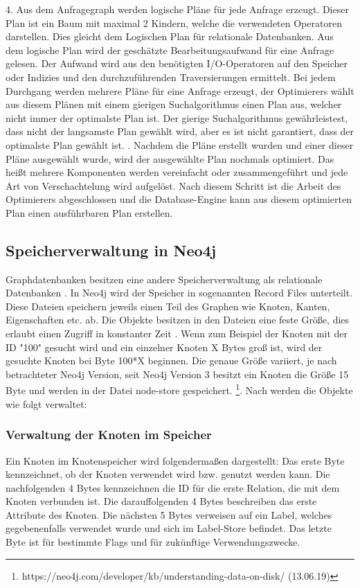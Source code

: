 4. Aus dem Anfragegraph werden logische Pläne für jede Anfrage erzeugt. Dieser Plan ist ein Baum mit maximal 2 Kindern, welche die verwendeten Operatoren darstellen. Dies gleicht dem Logischen Plan für relationale Datenbanken. Aus dem logische Plan wird der geschätzte Bearbeitungsaufwand für eine Anfrage gelesen. Der Aufwand wird aus den benötigten I/O-Operatoren auf den Speicher oder Indizies und den durchzuführenden Traversierungen ermittelt. Bei jedem Durchgang werden mehrere Pläne für eine Anfrage erzeugt, der Optimierers wählt aus diesem Plänen mit einem gierigen Suchalgorithmus einen Plan aus, welcher nicht immer der optimalste Plan ist. Der gierige Suchalgorithmus gewährleistest, dass nicht der langsamste Plan gewählt wird, aber es ist nicht garantiert, dass der optimalste Plan gewählt ist. \newline {}. Nachdem die Pläne erstellt wurden und einer dieser Pläne ausgewählt wurde, wird der ausgewählte Plan nochmals optimiert. Das heißt mehrere Komponenten werden vereinfacht oder zusammengeführt und jede Art von Verschachtelung wird aufgelöst. \newline \newline
Nach diesem Schritt  ist die Arbeit des Optimierers abgeschlossen und die Database-Engine kann aus diesem optimierten Plan einen ausführbaren Plan erstellen. 

\subsection{Speicherverwaltung in Neo4j}
Graphdatenbanken besitzen eine andere Speicherverwaltung als relationale Datenbanken \parencite{angles2012comparison}. In Neo4j wird der Speicher in sogenannten Record Files unterteilt. Diese Dateien speichern jeweils einen Teil des Graphen wie Knoten, Kanten, Eigenschaften etc. ab. Die Objekte besitzen in den Dateien eine feste Größe, dies erlaubt einen Zugriff in konstanter Zeit \parencite{robinson2013graph}. Wenn zum Beispiel der Knoten mit der ID "100" gesucht wird und ein einzelner Knoten X Bytes groß ist, wird der gesuchte Knoten bei Byte 100*X beginnen. Die genaue Größe  variiert, je nach betrachteter Neo4j Version, seit Neo4j Version 3 besitzt ein Knoten die Größe 15 Byte und werden in der Datei node-store gespeichert. \footnote{https://neo4j.com/developer/kb/understanding-data-on-disk/ (13.06.19)}. Nach \parencite{robinson2013graph} werden die Objekte wie folgt verwaltet:
\subsubsection{Verwaltung der Knoten im Speicher}
Ein Knoten im Knotenspeicher wird folgendermaßen dargestellt: Das erste Byte kennzeichnet, ob der Knoten verwendet wird bzw. genutzt werden kann. Die nachfolgenden 4 Bytes kennzeichnen die ID für die erste Relation, die mit dem Knoten verbunden ist. Die darauffolgenden 4 Bytes beschreiben das erste Attribute des Knoten. Die nächsten 5 Bytes verweisen auf ein Label, welches gegebenenfalls verwendet wurde und sich im Label-Store befindet. Das letzte Byte ist für bestimmte Flags und für zukünftige Verwendungszwecke. 
